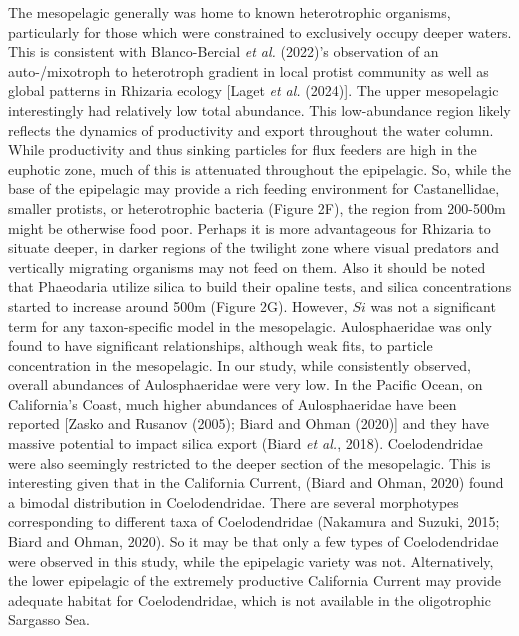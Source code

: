 \documentclass[
]{article}
\begin{document}
The mesopelagic generally was home to known heterotrophic organisms,
particularly for those which were constrained to exclusively occupy
deeper waters. This is consistent with Blanco-Bercial \emph{et al.}
(2022)'s observation of an auto-/mixotroph to heterotroph gradient in
local protist community as well as global patterns in Rhizaria ecology
{[}Laget \emph{et al.} (2024){]}. The upper mesopelagic interestingly
had relatively low total abundance. This low-abundance region likely
reflects the dynamics of productivity and export throughout the water
column. While productivity and thus sinking particles for flux feeders
are high in the euphotic zone, much of this is attenuated throughout the
epipelagic. So, while the base of the epipelagic may provide a rich
feeding environment for Castanellidae, smaller protists, or
heterotrophic bacteria (Figure 2F), the region from 200-500m might be
otherwise food poor. Perhaps it is more advantageous for Rhizaria to
situate deeper, in darker regions of the twilight zone where visual
predators and vertically migrating organisms may not feed on them. Also
it should be noted that Phaeodaria utilize silica to build their opaline
tests, and silica concentrations started to increase around 500m (Figure
2G). However, \(Si\) was not a significant term for any taxon-specific
model in the mesopelagic. Aulosphaeridae was only found to have
significant relationships, although weak fits, to particle concentration
in the mesopelagic. In our study, while consistently observed, overall
abundances of Aulosphaeridae were very low. In the Pacific Ocean, on
California's Coast, much higher abundances of Aulosphaeridae have been
reported {[}Zasko and Rusanov (2005); Biard and Ohman (2020){]} and they
have massive potential to impact silica export (Biard \emph{et al.},
2018). Coelodendridae were also seemingly restricted to the deeper
section of the mesopelagic. This is interesting given that in the
California Current, (Biard and Ohman, 2020) found a bimodal distribution
in Coelodendridae. There are several morphotypes corresponding to
different taxa of Coelodendridae (Nakamura and Suzuki, 2015; Biard and
Ohman, 2020). So it may be that only a few types of Coelodendridae were
observed in this study, while the epipelagic variety was not.
Alternatively, the lower epipelagic of the extremely productive
California Current may provide adequate habitat for Coelodendridae,
which is not available in the oligotrophic Sargasso Sea.
\end{document}
